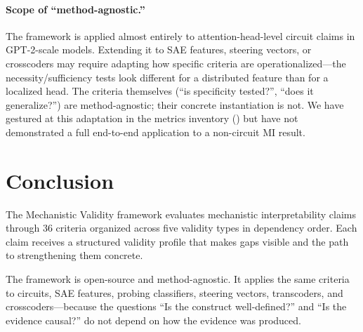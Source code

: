 \documentclass{article}
\begin{document}
\paragraph{Scope of ``method-agnostic.''}  The framework is applied almost entirely to attention-head-level circuit claims in GPT-2-scale models. Extending it to SAE features, steering vectors, or crosscoders may require adapting how specific criteria are operationalized---the necessity/sufficiency tests look different for a distributed feature than for a localized head. The criteria themselves (``is specificity tested?'', ``does it generalize?'') are method-agnostic; their concrete instantiation is not. We have gestured at this adaptation in the metrics inventory () but have not demonstrated a full end-to-end application to a non-circuit MI result.

\section{Conclusion}
\label{sec:conclusion}

The Mechanistic Validity framework evaluates mechanistic interpretability claims through 36 criteria organized across five validity types in dependency order. Each claim receives a structured validity profile that makes gaps visible and the path to strengthening them concrete.

The framework is open-source and method-agnostic. It applies the same criteria to circuits, SAE features, probing classifiers, steering vectors, transcoders, and crosscoders---because the questions ``Is the construct well-defined?'' and ``Is the evidence causal?'' do not depend on how the evidence was produced.

%
%
\end{document}
